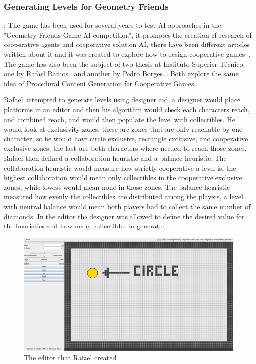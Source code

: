 \documentclass[runningheads]{llncs}
\begin{document}
\subsubsection{Generating Levels for Geometry Friends}:
The game has been used for several years to test AI approaches in the "Geometry Friends Game AI competition", it promotes the creation of research of cooperative agents and cooperative solution AI, there have been different articles written about it and it was created to explore how to design cooperative games~\cite{ref_rocha}. The game has also been the subject of two thesis at Instituto Superior Técnico, one by Rafael Ramos~\cite{ref_thesisrafael} and another by Pedro Borges~\cite{ref_thesispedro}. Both explore the same idea of Procedural Content Generation for Cooperative Games.

Rafael attempted to generate levels using designer aid, a designer would place platforms in an editor and then his algorithm would check each characters reach, and combined reach, and would then populate the level with collectibles. He would look at exclusivity zones, these are zones that are only reachable by one character, so he would have circle exclusive, rectangle exclusive, and cooperative exclusive zones, the last one both characters where needed to reach those zones. Rafael then defined a collaboration heuristic and a balance heuristic. The collaboration heuristic would measure how strictly cooperative a level is, the highest collaboration would mean only collectibles in the cooperative exclusive zones, while lowest would mean none in those zones. The balance heuristic measured how evenly the collectibles are distributed among the players, a level with neutral balance would mean both players had to collect the same number of diamonds. In the editor the designer was allowed to define the desired value for the heuristics and how many collectibles to generate.

\begin{figure}
    \centering
    \includegraphics[scale=0.30]{images/rafaeleditor.png}
    \caption{The editor that Rafael created}
    \label{fig:rafaeleditor}
\end{figure}
\end{document}
